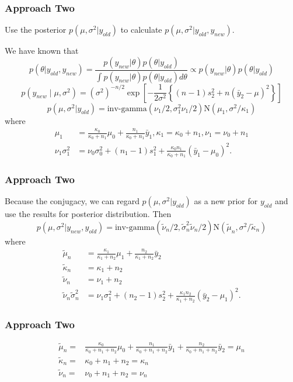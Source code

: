 \documentclass[compress]{beamer}
\begin{document}
\begin{frame}
\frametitle{Approach Two }
Use the posterior $p(\mu, \sigma^2|y_{old})$ to calculate $p(\mu, \sigma^2|y_{old},y_{new})$.

We have known that 
\[
p(\theta|y_{old},y_{new})=\frac{p(y_{new}|\theta)p(\theta|y_{old})}{\int p(y_{new}|\theta)p(\theta|y_{old})d\theta} \propto p(y_{new}|\theta)p(\theta|y_{old})
\]
\[
p(y_{new} \mid \mu, \sigma^2) = (\sigma^2)^{-n/2} \exp\left[ - \frac{1}{2\sigma^2}\left\{(n-1)  s_2^2 + n(\bar{y}_2 - \mu)^2 \right\} \right]
\]
\[p(\mu, \sigma^2|y_{old}) = \mbox{inv-gamma}(\nu_1/2, \sigma_1^2\nu_1/2) \mbox{N}(\mu_1, \sigma^2/\kappa_1)
\]
where
\begin{align*}
\mu_1 &= \frac{\kappa_0}{\kappa_0+n_1}\mu_0+\frac{n_1}{\kappa_0+n_1}\bar{y}_1, \kappa_1 =\kappa_0+n_1, \nu_1 = \nu_0+n_1\\
\nu_1\sigma^2_1 & = \nu_0\sigma_0^2+(n_1-1)s_1^2+\frac{\kappa_0 n_1}{\kappa_0 +n_1}(\bar{y}_1-\mu_0)^2.
\end{align*}

\end{frame}

\begin{frame}
\frametitle{Approach Two}
Because the conjugacy, we can regard $p(\mu, \sigma^2|y_{old})$ as a new prior for $y_{old}$ and use the results for posterior distribution. Then
\[
p(\mu,\sigma^2|y_{new},y_{old})=\mbox{inv-gamma}(\tilde{\nu}_n/2, \tilde{\sigma}_n^2\tilde{\nu}_n/2) \mbox{N}(\tilde{\mu}_n, \sigma^2/\tilde{\kappa}_n)
\]
where
\begin{align*}
\tilde{\mu}_n &= \frac{\kappa_1}{\kappa_1+n_2}\mu_1+\frac{n_2}{\kappa_1+n_2}\bar{y}_2\\
\tilde{\kappa}_n &=\kappa_1+n_2\\
\tilde{\nu}_n &= \nu_1+n_2\\
\tilde{\nu}_n\tilde{\sigma}^2_n & = \nu_1\sigma_1^2+(n_2-1)s_2^2+\frac{\kappa_1 n_2}{\kappa_1 +n_2}(\bar{y}_2-\mu_1)^2.
\end{align*}
\end{frame}

\begin{frame}
\frametitle{Approach Two}
\begin{align*}
\tilde{\mu}_n 
=&\frac{\kappa_0}{\kappa_0+n_1+n_2}\mu_0+\frac{n_1}{\kappa_0+n_1+n_2}\bar{y}_1+\frac{n_2}{\kappa_0+n_1+n_2}\bar{y}_2=\mu_n\\
\tilde{\kappa}_n =&\kappa_0+n_1+n_2=\kappa_n\\
\tilde{\nu}_n =& \nu_0+n_1+n_2=\nu_n
\end{align*}
\end{frame}
\end{document}
